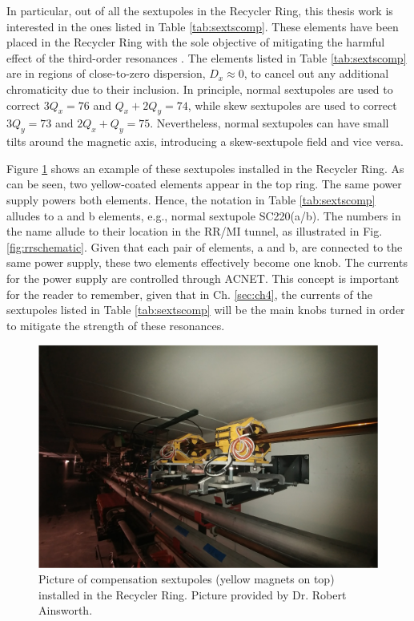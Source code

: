 In particular, out of all the sextupoles in the Recycler Ring, this thesis work is interested in the ones listed in Table \ref{tab:sextscomp}. These elements have been placed in the Recycler Ring with the sole objective of mitigating the harmful effect of the third-order resonances \cite{rr2}. The elements listed in Table \ref{tab:sextscomp} are in regions of close-to-zero dispersion, $D_x \approx 0$, to cancel out any additional chromaticity due to their inclusion. In principle, normal sextupoles are used to correct $3Q_x=76$ and $Q_x+2Q_y=74$, while skew sextupoles are used to correct $3Q_y=73$ and $2Q_x+Q_y=75$. Nevertheless, normal sextupoles can have small tilts around the magnetic axis, introducing a skew-sextupole field and vice versa.

Figure \ref{fig:sextupoles} shows an example of these sextupoles installed in the Recycler Ring. As can be seen, two yellow-coated elements appear in the top ring. The same power supply powers both elements. Hence, the notation in Table \ref{tab:sextscomp} alludes to a and b elements, e.g., normal sextupole SC220(a/b). The numbers in the name allude to their location in the RR/MI tunnel, as illustrated in Fig. \ref{fig:rrschematic}. Given that each pair of elements, a and b, are connected to the same power supply, these two elements effectively become one knob. The currents for the power supply are controlled through ACNET. This concept is important for the reader to remember, given that in Ch. \ref{sec:ch4}, the currents of the sextupoles listed in Table \ref{tab:sextscomp} will be the main knobs turned in order to mitigate the strength of these resonances.    

\begin{figure}[H]
   \centering
   \includegraphics[width=\columnwidth]{chapter3/sextupoles.png}
   \caption{Picture of compensation sextupoles (yellow magnets on top) installed in the Recycler Ring. Picture provided by Dr. Robert Ainsworth.}
   \label{fig:sextupoles}
\end{figure}